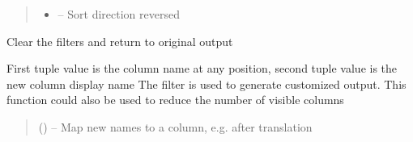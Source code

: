 \documentclass[letterpaper,10pt,english]{sphinxmanual}
\begin{document}
\begin{savenotes}
\begin{fulllineitems}
\begin{savenotes}
\begin{fulllineitems}
\begin{quote}
\begin{description}
\begin{itemize}
\item {} 
\sphinxAtStartPar
{} – Sort direction reversed

\end{itemize}

\end{description}\end{quote}

\end{fulllineitems}\end{savenotes}


\begin{savenotes}\begin{fulllineitems}
\label{\detokenize{eezz:eezz.table.TTable.filter_clear}}
\pysigstartsignatures
{}
\pysigstopsignatures
\sphinxAtStartPar
Clear the filters and return to original output

\end{fulllineitems}\end{savenotes}


\begin{savenotes}\begin{fulllineitems}
\label{\detokenize{eezz:eezz.table.TTable.filter_columns}}
\pysigstartsignatures
{}
\pysigstopsignatures
\sphinxAtStartPar
First tuple value is the column name at any position, second tuple value is the new column display name
The filter is used to generate customized output. This function could also be used to reduce the number of
visible columns
\begin{quote}\begin{description}
\sphinxAtStartPar
{} (\sphinxstyleliteralemphasis{\sphinxupquote{{[}}}\sphinxstyleliteralemphasis{\sphinxupquote{{]}}}) – Map new names to a column, e.g. after translation


\end{description}
\end{quote}
\end{fulllineitems}
\end{savenotes}
\end{fulllineitems}
\end{savenotes}
\end{document}
